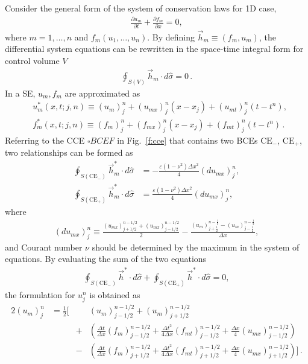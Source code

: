 \documentclass[11pt,dvips]{article}
\renewcommand{\figurename}{Fig.}
\numberwithin{equation}{section}
\begin{document}
Consider the general form of the system of conservation laws for 1D case,
\begin{align}
  \frac{\partial u_m}{\partial t} + \frac{\partial f_m}{\partial x} = 0
    , \label{e:syswave}
\end{align}
where $m=1,\ldots,n$ and $f_m(u_1,\ldots,u_n)$.  By defining
$\vec{h}_m\equiv(f_m,u_m)$, the differential system equations can be rewritten
in the space-time integral form for control volume $V$
\begin{align*}
  \oint_{S(V)}\vec{h}_m\cdot d\hat{\sigma} = 0\,.
\end{align*}
In a SE, $u_m, f_m$ are approximated as
\begin{align*}
  & u_m^*(x,t;j,n) \equiv (u_m)_j^n + (u_{mx})_j^n(x-x_j)
                        + (u_{mt})_j^n(t-t^n), \\
  & f_m^*(x,t;j,n) \equiv (f_m)_j^n + (f_{mx})_j^n(x-x_j)
                        + (f_{mt})_j^n(t-t^n)  \,.
\end{align*}
Referring to the CCE $\square BCEF$ in \figurename~\ref{f:cce} that contains
two BCEs $\mathrm{CE}_-$, $\mathrm{CE}_+$, two relationships can be formed as
\begin{align*}
  \oint_{S(\mathrm{CE}_-)} \vec{h}_m^*\cdot d\hat{\sigma} &=
    -\frac{\varepsilon(1-\nu^2)\Delta x^2}{4}(du_{mx})_j^n, \\
  \oint_{S(\mathrm{CE}_+)} \vec{h}_m^*\cdot d\hat{\sigma} &=
    \frac{\varepsilon(1-\nu^2)\Delta x^2}{4}(du_{mx})_j^n,
\end{align*}
where
\begin{align}
  (du_{mx})_j^n
    \equiv \frac{(u_{mx})_{j+1/2}^{n-1/2}
                + (u_{mx})_{j-1/2}^{n-1/2}}{2}
  - \frac{(u_m)_{j+\frac{1}{2}}^{n-\frac{1}{2}}
        - (u_m)_{j-\frac{1}{2}}^{n-\frac{1}{2}}}
         {\Delta x}, \label{e:dumx}
\end{align}
and Courant number $\nu$ should be determined by the maximum in the system of
equations.  By evaluating the sum of the two equations
\begin{align*}
    \oint_{S(\mathrm{CE}_-)} \vec{h}^*\cdot d\hat{\sigma}
  + \oint_{S(\mathrm{CE}_+)} \vec{h}^*\cdot d\hat{\sigma} = 0,
\end{align*}
the formulation for $u_j^n$ is obtained as
\begin{alignat*}{2}
  (u_m)_j^n &= \frac{1}{2}\Big[
      &&(u_m)_{j-1/2}^{n-1/2}+(u_m)_{j+1/2}^{n-1/2} \\
  & &+ &\left(
        \frac{\Delta t}{\Delta x}(f_m)_{j-1/2}^{n-1/2}
      + \frac{\Delta t^2}{4\Delta x}(f_{mt})_{j-1/2}^{n-1/2}
      + \frac{\Delta x}{4}(u_{mx})_{j-1/2}^{n-1/2}
      \right) \\
  & &- &\left(
        \frac{\Delta t}{\Delta x}(f_m)_{j+1/2}^{n-1/2}
      + \frac{\Delta t^2}{4\Delta x}(f_{mt})_{j+1/2}^{n-1/2}
      + \frac{\Delta x}{4}(u_{mx})_{j+1/2}^{n-1/2}
      \right)
    \Big]\,.
\end{alignat*}
\end{document}

